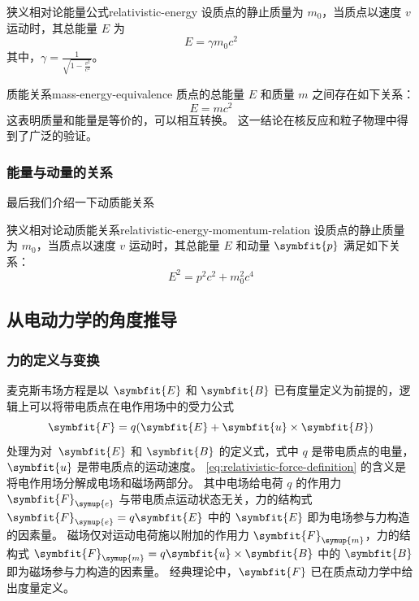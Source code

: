 \begin{theorem}{狭义相对论能量公式}{relativistic-energy}
    设质点的静止质量为 $m_0$，当质点以速度 $v$ 运动时，其总能量 $E$ 为
    \begin{equation}
        E = \gamma m_0 c^2
    \end{equation}
    其中，$\gamma = \frac{1}{\sqrt{1 - \frac{v^2}{c^2}}}$。
\end{theorem}

\begin{note}{质能关系}{mass-energy-equivalence}
    质点的总能量 $E$ 和质量 $m$ 之间存在如下关系：
    \begin{equation}
        E = m c^2
    \end{equation}
    这表明质量和能量是等价的，可以相互转换。
    这一结论在核反应和粒子物理中得到了广泛的验证。
\end{note}

\subsubsection{能量与动量的关系}

最后我们介绍一下动质能关系
\begin{theorem}{狭义相对论动质能关系}{relativistic-energy-momentum-relation}
    设质点的静止质量为 $m_0$，当质点以速度 $v$ 运动时，其总能量 $E$ 和动量 $\symbfit{p}$ 满足如下关系：
    \begin{equation}
        E^2 = p^2 c^2 + m_0^2 c^4
    \end{equation}
\end{theorem}

\subsection{从电动力学的角度推导\texorpdfstring{\cite{shuyousheng2005}}{}}

\subsubsection{力的定义与变换}

麦克斯韦场方程是以 $\symbfit{E}$ 和 $\symbfit{B}$ 已有度量定义为前提的，逻辑上可以将带电质点在电作用场中的受力公式
\begin{equation}
    \symbfit{F} = q (\symbfit{E} + \symbfit{u} \times \symbfit{B})
    \label{eq:relativistic-force-definition}
\end{equation}
处理为对 $\symbfit{E}$ 和 $\symbfit{B}$ 的定义式，式中 $q$ 是带电质点的电量，$\symbfit{u}$ 是带电质点的运动速度。
\cref{eq:relativistic-force-definition} 的含义是将电作用场分解成电场和磁场两部分。
其中电场给电荷 $q$ 的作用力 $\symbfit{F}_{\symup{e}}$ 与带电质点运动状态无关，力的结构式 $\symbfit{F}_{\symup{e}} = q \symbfit{E}$ 中的 $\symbfit{E}$ 即为电场参与力构造的因素量。
磁场仅对运动电荷施以附加的作用力 $\symbfit{F}_{\symup{m}}$，力的结构式 $\symbfit{F}_{\symup{m}} = q \symbfit{u} \times \symbfit{B}$ 中的 $\symbfit{B}$ 即为磁场参与力构造的因素量。
经典理论中，$\symbfit{F}$ 已在质点动力学中给出度量定义。

